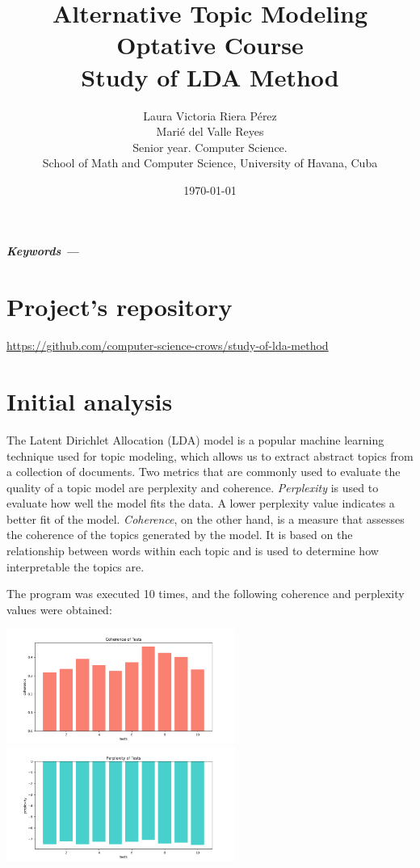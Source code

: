 \documentclass[10pt]{article} %
\title{\normalsize{Alternative Topic Modeling Optative Course}\\
	\Huge\bfseries Study of LDA Method \\
} %
\author{%
	Laura Victoria Riera P\'erez\\
	Mari\'e del Valle Reyes \vspace{1em} \\
	\small Senior year. Computer Science. \\ %
	\small School of Math and Computer Science, University of Havana, Cuba \\ %
}
\date{\footnotesize \today } %
\providecommand{\keywords}[1]
{
	\small	
	\vspace{0.5em}
	\noindent \textbf{\textit{Keywords --- }} #1
}
\renewenvironment{abstract}
{\small
	\begin{center}
		\bfseries \abstractname\vspace{-.5em}\vspace{0pt}
	\end{center}
	\list{}{
		\setlength{\leftmargin}{1.5cm}%
		\setlength{\rightmargin}{\leftmargin}%
	}%
	\item\relax}
{\endlist}
\begin{document}
	\maketitle
	
	\begin{abstract}
		\lipsum[1]
		
		\keywords{}
	\end{abstract}

	\section*{Project's repository}
	
	\begin{center}
		\href{https://github.com/computer-science-crows/study-of-lda-method}{https://github.com/computer-science-crows/study-of-lda-method}
	\end{center}
	
	\section{Initial analysis}
	
	The Latent Dirichlet Allocation (LDA) model is a popular machine learning technique used for topic modeling, which allows us to extract abstract topics from a collection of documents. Two metrics that are commonly used to evaluate the quality of a topic model are perplexity and coherence.
	\textit{Perplexity} is used to evaluate how well the model fits the data. A lower perplexity value indicates a better fit of the model. \textit{Coherence}, on the other hand, is a measure that assesses the coherence of the topics generated by the model. It is based on the relationship between words within each topic and is used to determine how interpretable the topics are. 
	
	The program was executed 10 times, and the following coherence and perplexity values were obtained:
	
	\begin{center}
		\includegraphics[width=7.5cm]{images/coherence_stopwords}
		\includegraphics[width=7.5cm]{images/perplexity_stopwords}
	\end{center}
\end{document}
